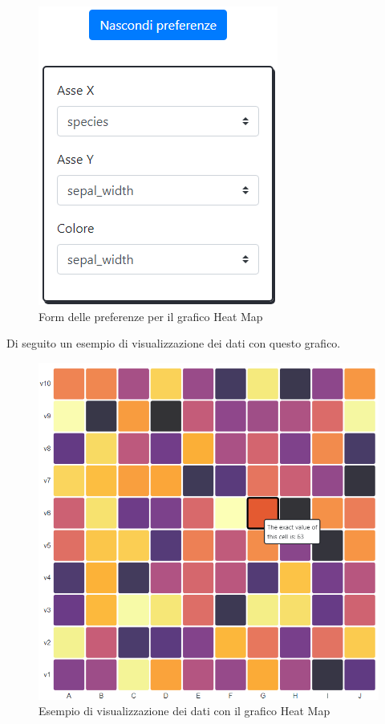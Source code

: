 \begin{figure}[H]
		\includegraphics[scale=0.6]{Images/hmp.png}
		\centering
		\caption{Form delle preferenze per il grafico Heat Map}
\end{figure}
Di seguito un esempio di visualizzazione dei dati con questo grafico.

\begin{figure}[H]
		\includegraphics[scale=0.4]{Images/hmb.png}
		\centering
		\caption{Esempio di visualizzazione dei dati con il grafico Heat Map}
\end{figure}

